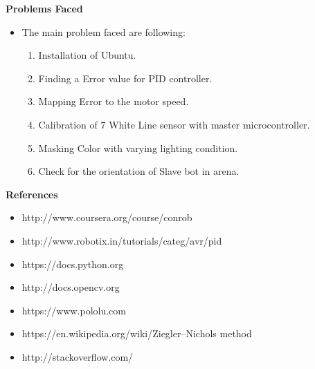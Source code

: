 \documentclass[report]{res}
\begin{document}
	\pagebreak
	
	
	\begin{center}
		{\huge\textbf{Problems Faced}\par}
	\end{center}
	
	\begin{itemize}
		\item The main problem faced are following:
		\begin{enumerate}
			\item Installation of Ubuntu.
			\item Finding a Error value for PID controller.
			\item Mapping Error to the motor speed.
			\item Calibration of 7 White Line sensor with master microcontroller.
			\item Masking Color with varying lighting condition.
			\item Check for the orientation of Slave bot in arena.
		\end{enumerate}
	\end{itemize}
	
	\pagebreak
	
	
	\begin{center}
		{\huge\textbf{References}\par}
	\end{center}
	
	\begin{itemize}
	
		\item http://www.coursera.org/course/conrob
		\item http://www.robotix.in/tutorials/categ/avr/pid
		\item https://docs.python.org
		\item http://docs.opencv.org
		\item https://www.pololu.com
		\item https://en.wikipedia.org/wiki/Ziegler–Nichols method
		\item http://stackoverflow.com/
	
	\end{itemize}
	
\end{document}
